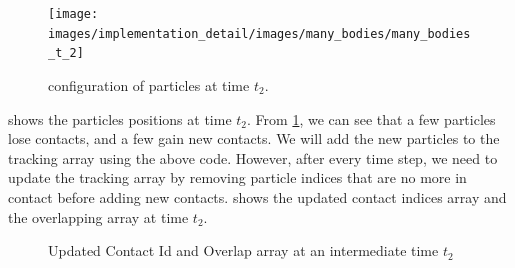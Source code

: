 \begin{figure}[!htpb]
  \centering
  \texttt{[image: images/implementation\_detail/images/many\_bodies/many\_bodies\_t\_2]}
  \caption{configuration of particles at time $t_2$.}
\label{fig:id:15_particle_t_2}
\end{figure}

 shows the particles positions at time $t_2$. From
\cref{fig:id:15_particle_t_2}, we can see that a few particles lose contacts, and
a few gain new contacts. We will add the new particles to the tracking array
using the above code. However, after every time step, we need to update the
tracking array by removing particle indices that are no more in contact before
adding new contacts.  shows
the updated contact indices array and the overlapping array at time $t_2$.
\begin{figure}[!htpb]
  \centering
  \caption{Updated Contact Id and Overlap array at an intermediate time $t_2$}
\label{fig:many_bodies_initialize_overlap_1_8_11_t_2}
\end{figure}

